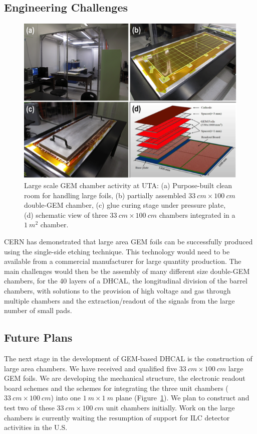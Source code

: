 \subsection{Engineering Challenges}
\begin{figure}
	\centering
	\includegraphics[width=.5\textwidth]{Calorimeter/GEM_HCAL/activitySummary}
	\caption{Large scale GEM chamber activity at UTA: (a) Purpose-built clean room for handling large foils,
(b) partially assembled $\SI{33}{cm} \times \SI{100}{cm}$ double-GEM chamber, (c) glue curing stage under pressure plate,
(d) schematic view of three $\SI{33}{cm} \times \SI{100}{cm}$ chambers integrated in a $\SI{1}{m^2}$ chamber.}
	\label{fig:Calorimeter:GEM:activitySummary}
\end{figure}
CERN has demonstrated that large area GEM foils can be successfully produced using the single-side etching technique. This technology would need to be available from a commercial manufacturer for large quantity production. The main challenges would then be the assembly of many different size double-GEM chambers, for the 40 layers of a DHCAL, the longitudinal division of the barrel chambers, with solutions to the provision of high voltage and gas through multiple chambers and the extraction/readout of the signals from the large number of small pads.
\subsection{Future Plans}
The next stage in the development of GEM-based DHCAL is the construction of large area chambers. We have received and qualified five $\SI{33}{cm}\times\SI{100}{cm}$ large GEM foils. We are developing the mechanical structure, the electronic readout board schemes and the schemes for integrating the three unit chambers ($\SI{33}{cm}\times\SI{100}{cm}$) into one $\SI{1}{m}\times\SI{1}{m}$ plane (Figure~\ref{fig:Calorimeter:GEM:activitySummary}). We plan to construct and test two of these $\SI{33}{cm}\times\SI{100}{cm}$ unit chambers initially.
Work on the large chambers is currently waiting the resumption of support for ILC detector activities in the U.S.
